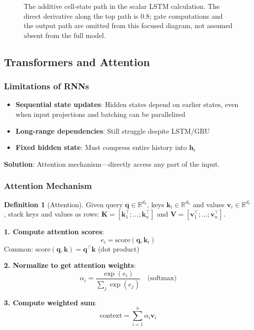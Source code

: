 \documentclass[11pt,twoside]{article}
\numberwithin{equation}{section}
\newcommand{\R}{\mathbb{R}}
\newcommand{\vect}[1]{\bm{#1}}
\theoremstyle{plain}
\theoremstyle{definition}
\newtheorem{definition}[theorem]{Definition}
\theoremstyle{remark}
\begin{document}
\begin{figure}[H]
\centering
{}
\caption{The additive cell-state path in the scalar LSTM calculation. The direct derivative along the top path is $0.8$; gate computations and the output path are omitted from this focused diagram, not assumed absent from the full model.}
\end{figure}

\subsection{Transformers and Attention}

\subsubsection{Limitations of RNNs}

\begin{itemize}
\item \textbf{Sequential state updates}: Hidden states depend on earlier states, even when input projections and batching can be parallelized
\item \textbf{Long-range dependencies}: Still struggle despite LSTM/GRU
\item \textbf{Fixed hidden state}: Must compress entire history into $\vect{h}_t$
\end{itemize}

\textbf{Solution}: Attention mechanism---directly access any part of the input.

\subsubsection{Attention Mechanism}

\begin{definition}[Attention]
Given query $\vect{q}\in\R^{d_k}$, keys $\vect{k}_i\in\R^{d_k}$ and values $\vect{v}_i\in\R^{d_v}$, stack keys and values as rows: $\vect{K}=[\vect{k}_1^\top;\ldots;\vect{k}_n^\top]$ and $\vect{V}=[\vect{v}_1^\top;\ldots;\vect{v}_n^\top]$.

\textbf{1. Compute attention scores}:
\[
e_i = \text{score}(\vect{q}, \vect{k}_i)
\]
Common: $\text{score}(\vect{q}, \vect{k}) = \vect{q}^\top\vect{k}$ (dot product)

\textbf{2. Normalize to get attention weights}:
\[
\alpha_i = \frac{\exp(e_i)}{\sum_j \exp(e_j)} \quad \text{(softmax)}
\]

\textbf{3. Compute weighted sum}:
\[
\text{context} = \sum_{i=1}^n \alpha_i \vect{v}_i
\]
\end{definition}
\end{document}
